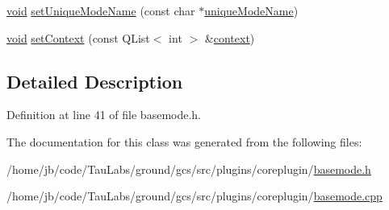 \begin{DoxyCompactItemize}
\item 
\hyperlink{group___u_a_v_objects_plugin_ga444cf2ff3f0ecbe028adce838d373f5c}{void} \hyperlink{group___core_plugin_ga58eb3bd31c083e486287c4535f0f7379}{set\-Unique\-Mode\-Name} (const char $\ast$\hyperlink{group___core_plugin_ga5712eab4028d979aa83e70cc8dd3962b}{unique\-Mode\-Name})
\item 
\hyperlink{group___u_a_v_objects_plugin_ga444cf2ff3f0ecbe028adce838d373f5c}{void} \hyperlink{group___core_plugin_ga0a0f1f0ef4b5c8d0f4c597564986235c}{set\-Context} (const \-Q\-List$<$ int $>$ \&\hyperlink{group___core_plugin_ga931f95d0ee3f352b7e43bbba9e228480}{context})
\end{DoxyCompactItemize}


\subsection{\-Detailed \-Description}


\-Definition at line 41 of file basemode.\-h.



\-The documentation for this class was generated from the following files\-:\begin{DoxyCompactItemize}
\item 
/home/jb/code/\-Tau\-Labs/ground/gcs/src/plugins/coreplugin/\hyperlink{basemode_8h}{basemode.\-h}\item 
/home/jb/code/\-Tau\-Labs/ground/gcs/src/plugins/coreplugin/\hyperlink{basemode_8cpp}{basemode.\-cpp}\end{DoxyCompactItemize}
